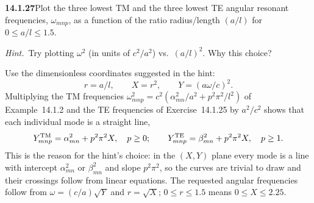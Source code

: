 \par\bigskip
\noindent\textbf{14.1.27}\quad Plot the three lowest TM and the three
lowest TE angular resonant frequencies, $\omega_{mnp}$, as a function
of the ratio radius/length $(a/l)$ for $0\le a/l\le1.5$.
\par\emph{Hint.}~Try plotting $\omega^{2}$ (in units of $c^{2}/a^{2}$)
vs.\ $(a/l)^{2}$. Why this choice?
\par{}
\solution
Use the dimensionless coordinates suggested in the hint:
\[
r=a/l,\qquad X=r^2,\qquad Y=(a\omega/c)^2.
\]
Multiplying the TM frequencies
$\omega_{mnp}^2=c^2(\alpha_{mn}^2/a^2+p^2\pi^2/l^2)$ of
Example~14.1.2 and the TE frequencies of Exercise~14.1.25 by
$a^2/c^2$ shows that each individual mode is a straight line,
\[
Y_{mnp}^{\rm TM}=\alpha_{mn}^2+p^2\pi^2X,\quad p\ge0;
\qquad
Y_{mnp}^{\rm TE}=\beta_{mn}^2+p^2\pi^2X,\quad p\ge1.
\]
This is the reason for the hint's choice: in the $(X,Y)$ plane every
mode is a line with intercept $\alpha_{mn}^2$ or $\beta_{mn}^2$ and
slope $p^2\pi^2$, so the curves are trivial to draw and their
crossings follow from linear equations.
The requested angular frequencies follow from
$\omega=(c/a)\sqrt{Y}$ and $r=\sqrt X$; $0\le r\le1.5$
means $0\le X\le2.25$.


